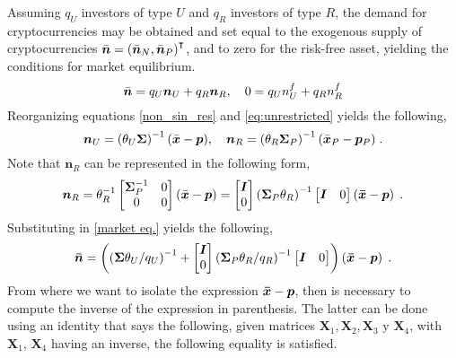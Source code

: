 \documentclass{article}
\begin{document}
Assuming $q_{U}$ investors of type $U$ and $q_R$ investors of type $R$, the demand for cryptocurrencies may be obtained and set equal to the exogenous supply of cryptocurrencies $\Bar{\bm{n}} = \left(\Bar{\bm{n}}_N, \Bar{\bm{n}}_P\right)^{\intercal}$, and to zero for the risk-free asset, yielding the conditions for market equilibrium.
\begin{equation}
	\Bar{\bm{n}} = q_{U}\bm{n}_{U} + q_{R}\bm{n}_{R},\quad 0 = q_{U}n^{f}_{U} + q_{R}n^{f}_{R}\label{market eq.}
\end{equation}
Reorganizing equations \eqref{non_sin_res} and \eqref{eq:unrestricted} yields the following,
\begin{equation*}
	\bm{n}_{U} = \left(\theta_{U}\bm{\Sigma}\right)^{-1}(\Bar{\bm{x}} - \bm{p}),\quad \bm{n}_{R} = \left(\theta_{R}\bm{\Sigma}_{P}\right)^{-1}(\Bar{\bm{x}}_{P} - \bm{p}_{P})\;. 
\end{equation*}
Note that $\bm{n}_R$ can be represented in the following form,
\begin{equation*}
	\bm{n}_R = \theta^{-1}_{R}\begin{bmatrix}
		\bm{\Sigma}^{-1}_{P} & 0\\
		0 & 0
	\end{bmatrix}
	(\Bar{\bm{x}}-\bm{p}) = \begin{bmatrix}
		\bm{I}\\
		0
	\end{bmatrix}
	\left(\bm{\Sigma}_P\theta_R\right)^{-1}\begin{bmatrix}
		\bm{I} & 0
	\end{bmatrix}
	\left(\bm{\Bar{x}}-\bm{p}\right)\;.
\end{equation*}
Substituting in \eqref{market eq.} yields the following,
\begin{equation}
	\bm{\Bar{n}}=\left(\left(\bm{\Sigma}\theta_U/q_U\right)^{-1}+\begin{bmatrix}
		\bm{I}\\
		0
	\end{bmatrix}
	\left(\bm{\Sigma}_P \theta_R/q_R\right)^{-1}\begin{bmatrix}
		\bm{I} & 0
	\end{bmatrix}\right)\left(\bm{\Bar{\bm{x}}}-\bm{p}\right)\;.
	\label{eq:dem_exogena}
\end{equation}
From where we want to isolate the expression $\bm{\Bar{x}}-\bm{p}$, then is necessary to compute the inverse of the expression in parenthesis. The latter can be done using an identity that says the following, given matrices $\bm{X}_1, \bm{X}_2, \bm{X}_3 \text{ y } \bm{X}_4$, with $\bm{X}_1$, $\bm{X}_4$ having an inverse, the following equality is satisfied.
\end{document}
